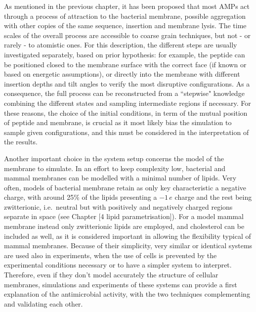 As mentioned in the previous chapter, it has been proposed that most AMPs act through a process of attraction to the bacterial membrane, possible aggregation with other copies of the same sequence, insertion and membrane lysis. The time scales of the overall process are accessible to coarse grain techniques, but not - or rarely - to atomistic ones. For this description, the different steps are usually investigated separately, based on prior hypothesis: for example, the peptide can be positioned closed to the membrane surface with the correct face (if known or based on energetic assumptions), or directly into the membrane with different insertion depths and tilt angles to verify the most disruptive configurations. As a consequence, the full process can be reconstructed from a ``stepwise" knowledge combining the different states and sampling intermediate regions if necessary. For these reasons, the choice of the initial conditions, in term of the mutual position of peptide and membrane, is crucial as it most likely bias the simulation to sample given configurations, and this must be considered in the interpretation of the results.

Another important choice in the system setup concerns the model of the membrane to simulate. In an effort to keep complexity low, bacterial and mammal membranes can be modelled with a minimal number of lipids.
%
Very often, models of bacterial membrane retain as only key characteristic a negative charge, with around 25\% of the lipids presenting a $-1\,e$ charge and the rest being zwitterionic, i.e.\ neutral but with positively and negatively charged regions separate in space (see Chapter [4 lipid parametrisation]).
For a model mammal membrane instead only zwitterionic lipids are employed, and cholesterol can be included as well, as it is considered important in allowing the flexibility typical of mammal membranes.
Because of their simplicity, very similar or identical systems are used also in experiments, when the use of cells is prevented by the experimental conditions necessary or to have a simpler system to interpret.
Therefore, even if they don't model accurately the structure of cellular membranes, simulations and experiments of these systems can provide a first explanation of the antimicrobial activity, with the two techniques complementing and validating each other.

